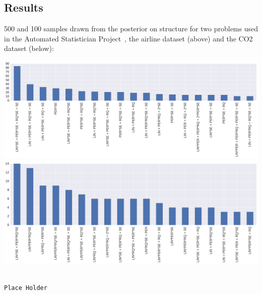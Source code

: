 \documentclass[a0,portrait]{a0poster}
\begin{document}
\begin{multicols}{2}
 \subsection*{Results}
 500 and 100 samples drawn from the posterior on structure for two problems used in the Automated Statistician Project~\cite{duvenaud2013structure}, the airline dataset (above) and the CO2 dataset (below):
 \begin{center}\vspace{1cm}
\includegraphics[width=0.7\linewidth]{structureCo2b.png}
\includegraphics[width=0.7\linewidth]{structureAirlinec.png}
\end{center}\vspace{1cm}
 \begin{minipage}{\linewidth}
\small
\begin{lstlisting}[frame=single,label=alg:structureVent,caption=Venture Code for Bayesian GP Structure Learning,mathescape]

Place Holder

\end{lstlisting}

\end{minipage}

\end{multicols}
\end{document}
